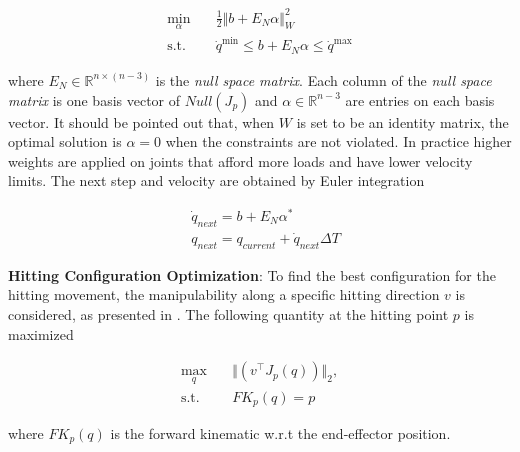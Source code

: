 \begin{equation*}
    \begin{aligned}
        \min_\alpha  \quad&\frac{1}{2} \Vert b + E_N \alpha \Vert^{2}_W \\
        \text{s.t.}  \quad&\dot{q}^{\min} \le b + E_N \alpha \le \dot{q}^{\max}
    \end{aligned}
\end{equation*}

where $E_N \in \mathbb{R}^{n\times \left(n - 3\right)}$ is the \textit{null space matrix}. Each column of the \textit{null space matrix} is one basis vector of
$Null(J_p)$ and $\alpha \in \mathbb{R}^{n-3}$ are entries on each basis vector. It should be pointed out that, when $W$ is set to be an identity matrix, the optimal solution
is $\alpha = 0$ when the constraints are not violated. In practice higher weights are applied on joints that afford more loads and have lower velocity limits.
The next step and velocity are obtained by Euler integration

\begin{equation*}
    \begin{aligned}
        &\dot{q}_{next} = b + E_N \alpha^* \\
        &q_{next} = q_{current} + \dot{q}_{next} \Delta T
    \end{aligned}
\end{equation*}

\textbf{Hitting Configuration Optimization}:
To find the best configuration for the hitting movement, the manipulability along a specific hitting direction $v$ is considered, as presented in \cite{manipulability}.
The following quantity at the hitting point $p$ is maximized

\begin{equation*}
    \begin{aligned}
        \max_q \quad& \Vert \left(v^\intercal J_p(q) \right) \Vert_2, \\
        \text{s.t.} \quad& FK_p(q) = p
    \end{aligned}
\end{equation*}

where $FK_p(q)$ is the forward kinematic w.r.t the end-effector position.


